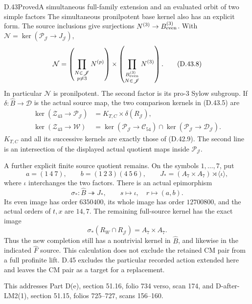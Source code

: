 \begin{statement}{D.43}{Proved}{A simultaneous full-family extension and an evaluated orbit of two simple factors}
The simultaneous pronilpotent base kernel
also has an explicit form. The source
inclusions give surjections
$N^{(3)}\to B_{\rm even}^{(3)}$. With
$\mathcal N=\ker(\mathcal P_{\mathscr J}
                       \to J_{\mathscr J})$,
\[
 \mathcal N
   =\left(\prod_{\substack{N\in\mathscr J\\p\ne3}}
                                       N^{(p)}\right)
       \times
        \left(\mathop{\prod_{B_{\rm even}^{(3)}}}_{N\in\mathscr J}
                                       N^{(3)}\right).          \tag{D.43.8}
\]
In particular $\mathcal N$ is pronilpotent.
The second factor is its pro-$3$ Sylow
subgroup. If $\delta:\widehat B\to\mathcal D$
is the actual source map, the two comparison
kernels in (D.43.5) are
\[
 \begin{split}
 \ker(\mathcal Z_{43}\to\mathcal P_{\mathscr J})
    &=K_{T,C}\times\delta(R_{\mathscr J}),\\
 \ker(\mathcal Z_{43}\to\mathcal W)
    &=\ker(\mathcal P_{\mathscr J}\to\mathcal C_{54})
        \cap
      \ker(\mathcal P_{\mathscr J}\to\mathcal D_{\mathscr J}).
 \end{split}                                                   \tag{D.43.9}
\]
$K_{T,C}$ and all its successive kernels
are exactly those of (D.42.9). The second
line is an intersection of the displayed
actual quotient maps inside
$\mathcal P_{\mathscr J}$.

A further explicit finite source quotient
remains. On the symbols $1,\ldots,7$, put
\[
 a=(1\ 4\ 7),\qquad
 b=(1\ 2\ 3)(4\ 5\ 6),\qquad
 J_*=(A_7\times A_7)\rtimes\langle\iota\rangle ,
                                                               \tag{D.43.10}
\]
where $\iota$ interchanges the two factors.
There is an actual epimorphism
\[
 \sigma_*:\widehat B\twoheadrightarrow J_*,
       \qquad s\longmapsto\iota,\quad r\longmapsto(a,b).
                                                               \tag{D.43.11}
\]
Its even image has order $6350400$, its
whole image has order $12700800$, and
the actual orders of $t,x$ are $14,7$.
The remaining full-source kernel has
the exact image
\[
       \sigma_*(R_W\cap R_{\mathscr J})
                         =A_7\times A_7.                       \tag{D.43.12}
\]
Thus the new completion still has a nontrivial
kernel in $\widehat B$, and likewise in the
indicated $\widehat F$ source. This calculation
does not exclude the retained CM pair from
a full profinite lift. D.45 excludes the particular recorded
action extended here and leaves the CM pair as a target
for a replacement.

This addresses Part D(e), section 51.16,
folio 734 verso, scan 174, and
D-after-LM2(1), section 51.15,
folios 725--727, scans 156--160.
\end{statement}
